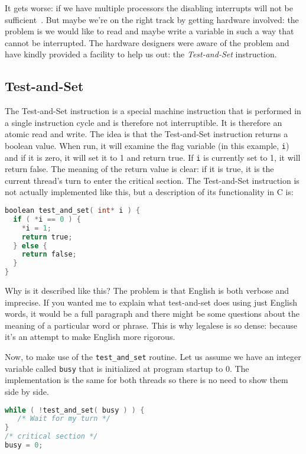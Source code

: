 It gets worse: if we have multiple processors the disabling interrupts will not be sufficient~\cite{osi}. But maybe we're on the right track by getting hardware involved: the problem is we would like to read and maybe write a variable in such a way that cannot be interrupted. The hardware designers were aware of the problem and have kindly provided a facility to help us out: the \textit{Test-and-Set} instruction.

\subsection*{Test-and-Set}
The Test-and-Set instruction is a special machine instruction that is performed in a single instruction cycle and is therefore not interruptible. It is therefore an atomic read and write. The idea is that the Test-and-Set instruction returns a boolean value. When run, it will examine the flag variable (in this example, \texttt{i}) and if it is zero, it will set it to 1 and return true. If \texttt{i} is currently set to 1, it will return false. The meaning of the return value is clear: if it is true, it is the current thread's turn to enter the critical section. The Test-and-Set instruction is not actually implemented like this, but a description of its functionality in C is:

\begin{lstlisting}[language=C]
boolean test_and_set( int* i ) {
  if ( *i == 0 ) {
    *i = 1;
    return true;
  } else {
    return false;
  }
}
\end{lstlisting}

Why is it described like this? The problem is that English is both verbose and imprecise. If you wanted me to explain what test-and-set does using just English words, it would be a full paragraph and there might be some questions about the meaning of a particular word or phrase. This is why legalese is so dense: because it's an attempt to make English more rigorous.

Now, to make use of the \texttt{test\_and\_set} routine. Let us assume we have an integer variable called \texttt{busy} that is initialized at program startup to 0. The implementation is the same for both threads so there is no need to show them side by side.

\begin{lstlisting}[language=C]
while ( !test_and_set( busy ) ) {
   /* Wait for my turn */
}
/* critical section */
busy = 0;
\end{lstlisting}

